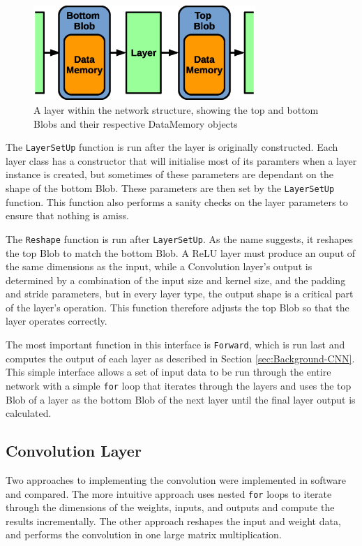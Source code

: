 \documentclass[12pt]{article}
\begin{document}
\begin{figure}[h]
\centering
\includegraphics[width=0.75\textwidth]{figures/layer.eps}
\caption{A layer within the network structure, showing the top and bottom Blobs and their respective DataMemory objects}
\label{fig:layer}
\end{figure}

The \lstinline|LayerSetUp| function is run after the layer is originally constructed. Each layer class has a constructor that will initialise most of its paramters when a layer instance is created, but sometimes of these parameters are dependant on the shape of the bottom Blob. These parameters are then set by the \lstinline|LayerSetUp| function. This function also performs a sanity checks on the layer parameters to ensure that nothing is amiss.

The \lstinline|Reshape| function is run after \lstinline|LayerSetUp|. As the name suggests, it reshapes the top Blob to match the bottom Blob. A ReLU layer must produce an ouput of the same dimensions as the input, while a Convolution layer's output is determined by a combination of the input size and kernel size, and the padding and stride parameters, but in every layer type, the output shape is a critical part of the layer's operation. This function therefore adjusts the top Blob so that the layer operates correctly.

The most important function in this interface is \lstinline|Forward|, which is run last and computes the output of each layer as described in Section \ref{sec:Background-CNN}. This simple interface allows a set of input data to be run through the entire network with a simple \lstinline|for| loop that iterates through the layers and uses the top Blob of a layer as the bottom Blob of the next layer until the final layer output is calculated.

\subsection{Convolution Layer}
\label{sec:Imp-Conv}

Two approaches to implementing the convolution were implemented in software and compared. The more intuitive approach uses nested \lstinline|for| loops to iterate through the dimensions of the weights, inputs, and outputs and compute the results incrementally. The other approach reshapes the input and weight data, and performs the convolution in one large matrix multiplication. 
\end{document}
